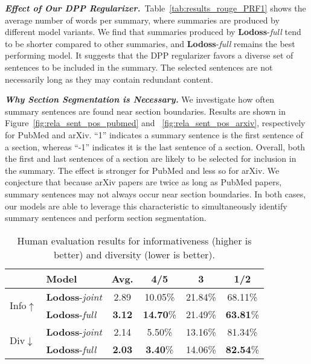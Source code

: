 \documentclass[11pt]{article}
\begin{document}
\vspace{0.05in}
\noindent\textbf{\textsl{Effect of Our DPP Regularizer.}}\quad\,
Table~\ref{tab:results_rouge_PRF1} shows the average number of words per summary,
where summaries are produced by different model variants.
We find that summaries produced by \textbf{Lodoss}-\emph{full}
tend to be shorter compared to other summaries,
and \textbf{Lodoss}-\emph{full} remains the best performing model.
It suggests that the DPP regularizer favors a diverse set of sentences to be included in the summary. 
The selected sentences are not necessarily long as they may contain redundant content.


\vspace{0.05in}
\noindent\textbf{\textsl{Why Section Segmentation is Necessary.}}\quad
We investigate how often summary sentences are found near section boundaries. 
Results are shown in Figure~\ref{fig:rela_sent_pos_pubmed} and ~\ref{fig:rela_sent_pos_arxiv}, respectively for PubMed and arXiv.
``1'' indicates a summary sentence is the first sentence of a section,
whereas ``-1'' indicates it is the last sentence of a section.
Overall, both the first and last sentences of a section are likely to be
selected for inclusion in the summary.
The effect is stronger for PubMed and less so for arXiv. 
We conjecture that because arXiv papers are twice as long as PubMed papers,
summary sentences may not always occur near section boundaries. 
In both cases, our models are able to leverage this characteristic to simultaneously identify summary sentences and perform section segmentation.




\begin{table}[!t]
\setlength{\tabcolsep}{3.8pt}
\renewcommand{\arraystretch}{1.1}
\centering
\footnotesize
\begin{small}
\begin{tabular}{|ll|c|c|c|c|}
\hline
& \textbf{Model} & \textbf{Avg.} & \textbf{4/5} & \textbf{3} & \textbf{1/2} \\
\hline
\hline
\multirow{2}{*}{{Info$\uparrow$}} & \textbf{Lodoss}-\emph{joint}& 2.89 & 10.05\% & 21.84\% & 68.11\%\\
& \textbf{Lodoss}-\emph{full}& \textbf{3.12} & \textbf{14.70}\% & 21.49\% & \textbf{63.81}\%\\
\hline
\hline
\multirow{2}{*}{{Div$\downarrow$}} & \textbf{Lodoss}-\emph{joint}& 2.14  & 5.50\% & 13.16\% & 81.34\%\\
& \textbf{Lodoss}-\emph{full}& \textbf{2.03} & \textbf{3.40}\% & 14.06\% & \textbf{82.54}\%\\
\hline
\end{tabular}
\end{small}
\vspace{-0.05in}
\caption{Human evaluation results for informativeness (higher is better) and diversity (lower is better).}
\label{tab:human_eval}
\end{table}
\end{document}
